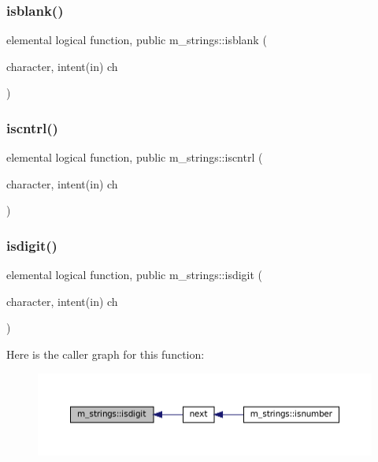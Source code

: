 \subsubsection{\texorpdfstring{isblank()}{isblank()}}
{\footnotesize\ttfamily elemental logical function, public m\+\_\+strings\+::isblank (\begin{DoxyParamCaption}\item[{character, intent(in)}]{ch }\end{DoxyParamCaption})}

\mbox{\label{namespacem__strings_a4821cb5a5c4024c9dc6dd159300034ca}} 
\subsubsection{\texorpdfstring{iscntrl()}{iscntrl()}}
{\footnotesize\ttfamily elemental logical function, public m\+\_\+strings\+::iscntrl (\begin{DoxyParamCaption}\item[{character, intent(in)}]{ch }\end{DoxyParamCaption})}

\mbox{\label{namespacem__strings_a9f5f98a6c93e21618a16d98a5de2debc}} 
\subsubsection{\texorpdfstring{isdigit()}{isdigit()}}
{\footnotesize\ttfamily elemental logical function, public m\+\_\+strings\+::isdigit (\begin{DoxyParamCaption}\item[{character, intent(in)}]{ch }\end{DoxyParamCaption})}

Here is the caller graph for this function\+:\nopagebreak
\begin{figure}[H]
\begin{center}
\leavevmode
\includegraphics[width=350pt]{namespacem__strings_a9f5f98a6c93e21618a16d98a5de2debc_icgraph}
\end{center}
\end{figure}
\mbox{\label{namespacem__strings_a84c80fdeeba0679488ed8ad8d37e53c5}} 
